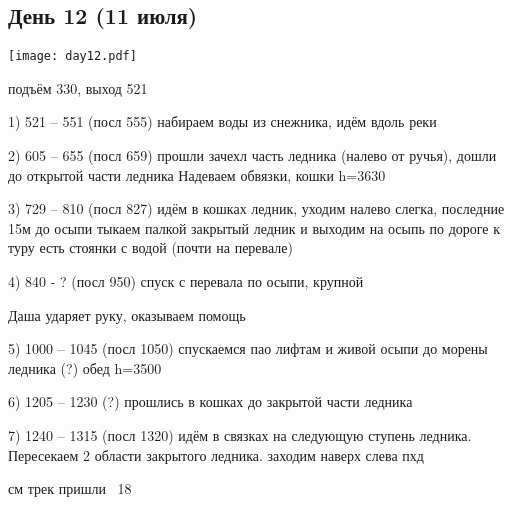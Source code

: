 \graphicspath{{Pictures/Chapter5/Day12}}


\subsection{День 12 (11 июля)}\label{subsec:Day12}
    \parbox[c]{\textwidth}{%
        \texttt{[image: day12.pdf]}\label{fig:Day12_map}%
    }
    \vspace{0.8cm}

подъём 330, выход 521

1) 521 -- 551 (посл 555) набираем воды из снежника, идём вдоль реки

2) 605 -- 655 (посл 659) прошли зачехл часть ледника (налево от ручья), дошли до открытой части ледника Надеваем обвязки, кошки h=3630

3) 729 -- 810 (посл 827) идём в кошках ледник, уходим налево слегка, последние 15м до осыпи тыкаем палкой закрытый ледник и выходим на осыпь
по дороге к туру есть стоянки с водой (почти на перевале)

4) 840 - ? (посл 950) спуск с перевала по осыпи, крупной

Даша ударяет руку, оказываем помощь

5) 1000 -- 1045 (посл 1050) спускаемся пао лифтам и живой осыпи до морены ледника (?) обед h=3500

6) 1205 -- 1230 (?) прошлись в кошках до закрытой части ледника

7) 1240 -- 1315 (посл 1320) идём в связках на следующую ступень ледника. Пересекаем 2 области закрытого ледника. заходим наверх слева пхд

см трек пришли ~18


    \FloatBarrier
